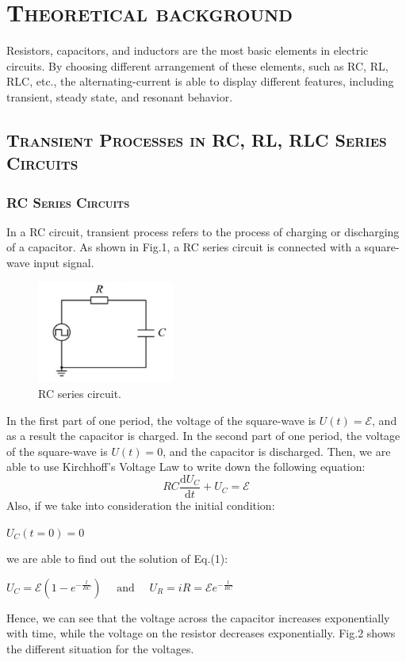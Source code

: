 \documentclass[a4paper,12pt]{article}
\begin{document}
\section{\textsc{Theoretical background}}
Resistors, capacitors, and inductors are the most basic elements in electric circuits. By choosing different arrangement of these elements, such as RC, RL, RLC, etc., the alternating-current is able to display different features, including transient, steady state, and resonant behavior.
\subsection{\textsc{Transient Processes in RC, RL, RLC Series Circuits}}
\subsubsection{\textsc{RC Series Circuits}}
In a RC circuit, transient process refers to the process of charging or discharging of a capacitor. As shown in Fig.1, a RC series circuit is connected with a square-wave input signal.

\begin{figure}[htb] 
    \centering
    \includegraphics[width=0.4\textwidth]{Fig1} 
    \caption{RC series circuit. \cite{labmanual}} 
\end{figure}

In the first part of one period, the voltage of the square-wave is $U(t)=\mathcal{E}$, and as a result the capacitor is charged. In the second part of one period, the voltage of the square-wave is $U(t)=0$, and the capacitor is discharged. Then, we are able to use Kirchhoff’s Voltage Law to write down the following equation:
\begin{equation}
R C \frac{\mathrm{d} U_{C}}{\mathrm{d} t}+U_{C}=\mathcal{E}
\end{equation}
Also, if we take into consideration the initial condition:
\begin{center}
$U_{C}(t=0)=0$
\end{center}
we are able to find out the solution of Eq.(1):
\begin{center}
$U_{C}=\mathcal{E}\left(1-e^{-\frac{t}{R C}}\right) \quad \text { and } \quad U_{R}=i R=\mathcal{E} e^{-\frac{t}{R C}}$
\end{center}
Hence, we can see that the voltage across the capacitor increases exponentially with time, while the voltage on the resistor decreases exponentially. Fig.2 shows the different situation for the voltages.
\end{document}
